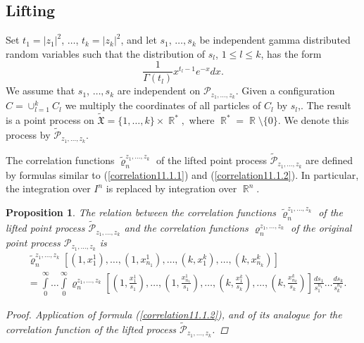 \documentclass[12pt]{amsart}
\newtheorem{prop}[thm]{Proposition}
\theoremstyle{definition}
\numberwithin{equation}{section}
\DeclareMathOperator{\R}{\mathbb{R}}
\begin{document}
\subsection{Lifting}\label{SectionLifting}
Set $t_1=|z_1|^2$, $\ldots$, $t_k=|z_k|^2$, and let $s_1$, $\ldots,s_k$ be independent gamma distributed random variables such that the distribution of $s_l$, $1\leq l\leq k$, has the form
$$
\frac{1}{\Gamma(t_l)}x^{t_l-1}e^{-x}dx.
$$
We assume that $s_1$, $\ldots,s_k$ are independent on  $\mathcal{P}_{z_1,\ldots,z_k}$. Given a configuration $C=\cup_{l=1}^kC_l$ we multiply the coordinates of all particles of $C_l$ by $s_l$,. The result is a point process on
$\widetilde{\mathfrak{X}}
=\{1,\ldots,k\}\times\R^{\ast},
$
where $\R^{\ast}=\R\setminus\{0\}$. We denote this process by
$\widetilde{\mathcal{P}}_{z_1,\ldots,z_k}$.

The correlation functions $\widetilde{\varrho}_n^{z_1,\ldots,z_k}$
of the lifted point process $\widetilde{\mathcal{P}}_{z_1,\ldots,z_k}$ are defined by formulas similar to (\ref{correlation11.1.1}) and (\ref{correlation11.1.2}). In particular, the integration over $I^{n}$ is replaced by integration over $\R^{n}$.
\begin{prop} The relation between the correlation functions $\widetilde{\varrho}_n^{z_1,\ldots,z_k}$ of the lifted point process
$\widetilde{\mathcal{P}}_{z_1,\ldots,z_k}$ and the correlation functions $\varrho_n^{z_1,\ldots,z_k}$ of the original point process $\mathcal{P}_{z_1,\ldots,z_k}$
 is
\begin{equation}
\begin{split}
&\widetilde{\varrho}_n^{z_1,\ldots,z_k}\left[\left(1,x_1^1\right),\ldots,\left(1,x_{n_1}^1\right),\ldots,\left(k,x_{1}^{k}\right),\ldots,\left(k,x^k_{n_k}\right)\right]\\
&=\int\limits_0^{\infty}\ldots\int\limits_{0}^{\infty}
\varrho_n^{z_1,\ldots,z_k}\left[\left(1,\frac{x_1^1}{s_1}\right),\ldots,\left(1,\frac{x_{n_1}^1}{s_1}\right),\ldots,\left(k,\frac{x_{1}^{k}}{s_k}\right),\ldots,\left(k,\frac{x^k_{n_k}}{s_k}\right)\right]
\frac{ds_1}{s_1^{n_1}}\ldots\frac{ds_k}{s_k^{n_k}}.
\nonumber
\end{split}
\end{equation}
\begin{proof} Application of formula (\ref{correlation11.1.2}), and of its analogue for the correlation function of the lifted process $\widetilde{\mathcal{P}}_{z_1,\ldots,z_k}$.
\end{proof}


































\end{prop}
\end{document}
